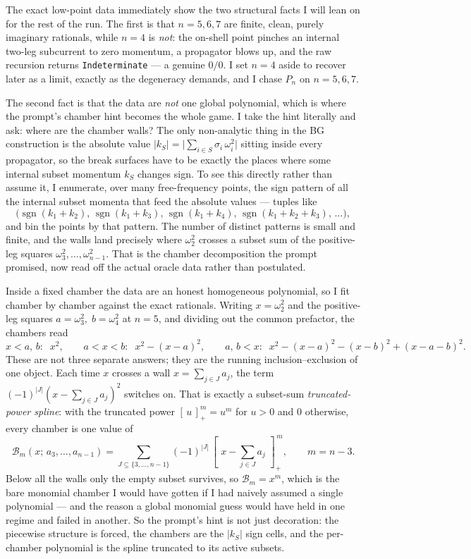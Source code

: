 \documentclass{article}
\newcommand{\pp}[1]{\left[\,#1\,\right]_{+}}
\begin{document}
The exact low-point data immediately show the two structural facts I will lean
on for the rest of the run. The first is that $n=5,6,7$ are finite, clean, purely
imaginary rationals, while $n=4$ is \emph{not}: the on-shell point pinches an
internal two-leg subcurrent to zero momentum, a propagator blows up, and the raw
recursion returns \texttt{Indeterminate} --- a genuine $0/0$. I set $n=4$ aside
to recover later as a limit, exactly as the degeneracy demands, and I chase
$P_n$ on $n=5,6,7$.

The second fact is that the data are \emph{not} one global polynomial, which is
where the prompt's chamber hint becomes the whole game. I take the hint
literally and ask: where are the chamber walls? The only non-analytic thing in
the BG construction is the absolute value $|k_S|=\big|\sum_{i\in S}\sigma_i\,
\omega_i^2\big|$ sitting inside every propagator, so the break surfaces have to
be exactly the places where some internal subset momentum $k_S$ changes sign. To
see this directly rather than assume it, I enumerate, over many free-frequency
points, the sign pattern of all the internal subset momenta that feed the
absolute values --- tuples like
\[
\big(\operatorname{sgn}(k_1{+}k_2),\,\operatorname{sgn}(k_1{+}k_3),\,
\operatorname{sgn}(k_1{+}k_4),\,
\operatorname{sgn}(k_1{+}k_2{+}k_3),\,\dots\big),
\]
and bin the points by that pattern. The number of distinct patterns is small and
finite, and the walls land precisely where $\omega_2^2$ crosses a subset sum of
the positive-leg squares $\omega_3^2,\dots,\omega_{n-1}^2$. That is the chamber
decomposition the prompt promised, now read off the actual oracle data rather
than postulated.

Inside a fixed chamber the data are an honest homogeneous polynomial, so I fit
chamber by chamber against the exact rationals. Writing $x=\omega_2^2$ and the
positive-leg squares $a=\omega_3^2,\;b=\omega_4^2$ at $n=5$, and dividing out the
common prefactor, the chambers read
\[
x<a,\,b:\;\; x^{2},\qquad
a<x<b:\;\; x^2-(x-a)^2,\qquad
a,\,b<x:\;\; x^2-(x-a)^2-(x-b)^2+(x-a-b)^2 .
\]
These are not three separate answers; they are the running inclusion--exclusion
of one object. Each time $x$ crosses a wall $x=\sum_{j\in J}a_j$, the term
$(-1)^{|J|}(x-\sum_{j\in J}a_j)^2$ switches on. That is exactly a subset-sum
\emph{truncated-power spline}: with the truncated power $\pp{u}^m=u^m$ for $u>0$
and $0$ otherwise, every chamber is one value of
\[
\mathcal B_m(x;\,a_3,\dots,a_{n-1})
=\sum_{J\subseteq\{3,\dots,n-1\}}(-1)^{|J|}\,
\pp{\,x-\sum_{j\in J}a_j\,}^{\,m},
\qquad m=n-3 .
\]
Below all the walls only the empty subset survives, so $\mathcal B_m=x^m$, which
is the bare monomial chamber I would have gotten if I had naively assumed a
single polynomial --- and the reason a global monomial guess would have held in
one regime and failed in another. So the prompt's hint is not just decoration:
the piecewise structure is forced, the chambers are the $|k_S|$ sign cells, and
the per-chamber polynomial is the spline truncated to its active subsets.
\end{document}
